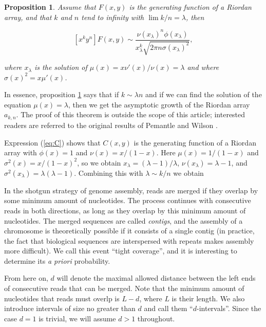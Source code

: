 \documentclass{article}
\newtheorem{proposition}{Proposition}
\begin{document}
\begin{proposition}
\label{th:PW}
Assume that $F(x,y)$ is the generating function of a Riordan array, and
that $k$ and $n$ tend to infinity with $\lim k/n = \lambda$, then

\begin{equation}
\label{eq:assRA}
[x^ky^n]F(x,y) \sim \frac{\nu(x_\lambda)^n\phi(x_\lambda)}
  {x_\lambda^k\sqrt{2\pi n \sigma(x_\lambda)^2}},
\end{equation}

\noindent
where $x_\lambda$ is the solution of $\mu(x) = x\nu'(x)/\nu(x) = \lambda$
and where $\sigma(x)^2 = x \mu'(x)$.
\end{proposition}

In essence, proposition \ref{th:PW} says that if $k \sim \lambda n$ and if
we can find the solution of the equation $\mu(x) = \lambda$, then we get
the asymptotic growth of the Riordan array $a_{k,n}$. The proof of this
theorem is outside the scope of this article; interested readers are
referred to the original results of Pemantle and Wilson
\cite{PemWil02,AnalComb2013}.

Expression (\ref{eq:C}) shows that $C(x,y)$ is the generating function of
a Riordan array with $\phi(x) = 1$ and $\nu(x) = x/(1-x)$.  Here $\mu(x) =
1/(1-x)$ and $\sigma^2(x) = x/(1-x)^2$, so we obtain $x_\lambda = (\lambda
-1)/\lambda$, $\nu(x_\lambda) = \lambda -1$, and $\sigma^2(x_\lambda) =
\lambda(\lambda-1)$. Combining this with $\lambda \sim k/n$ we obtain

In the shotgun strategy of genome assembly, reads are merged if they
overlap by some minimum amount of nucleotides. The process continues with
consecutive reads in both directions, as long as they overlap by this
minimum amount of nucleotides. The merged sequences are called
\emph{contigs}, and the assembly of a chromosome is theoretically possible
if it consists of a single contig (in practice, the fact that biological
sequences are interspersed with repeats makes assembly more difficult). We
call this event ``tight coverage'', and it is interesting to determine
its \textit{a priori} probability.

From here on, $d$ will denote the maximal allowed distance between the
left ends of consecutive reads that can be merged. Note that the minimum
amount of nucleotides that reads must overlp is $L-d$, where $L$ is their
length. We also introduce intervals of size no greater than $d$ and call
them ``$d$-intervals''. Since the case $d=1$ is trivial, we will assume $d
> 1$ throughout.
\end{document}
